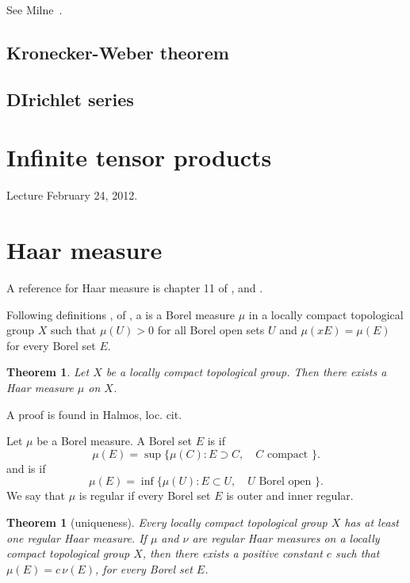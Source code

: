 \documentclass{amsart}
\newtheorem{theorem}[equation]{Theorem}
\begin{document}
See Milne~\cite[p. 154, 3.8,~Ex~3.9]{CFT}.

\subsection{Kronecker-Weber theorem}


\subsection{DIrichlet series}





\section{Infinite tensor products}

Lecture February 24, 2012.


\newpage
\section{Haar measure}

A reference for Haar measure is chapter 11 of \cite{Halmos-measure}, and
\cite[sec. 3]{bushnell-henniart}.   

Following definitions , 
of \cite{Halmos-measure},
a  is a Borel measure $\mu$ in a locally compact
topological group $X$ such that $\mu(U)>0$ for all Borel open sets $U$
and $\mu(x E) =\mu(E)$ for every Borel set $E$.

\begin{theorem} Let $X$ be a locally compact topological group.
Then there exists a Haar measure $\mu$ on $X$.
\end{theorem}

A proof is found in Halmos, loc. cit.

Let $\mu$ be a Borel measure.
A Borel set $E$ is 
 if
\[
\mu(E) = \sup \{\mu(C) : E\supset C,\quad C \text{ compact } \}.
\]
and is 
 if 
\[
\mu(E) = \inf \{\mu(U) : E\subset U,\quad U \text{ Borel open } \}.
\]
We say that $\mu$ is regular if every Borel set $E$ is outer and inner regular.

\begin{theorem}[uniqueness]  Every locally compact topological group $X$ has
 at least one regular Haar measure.  If $\mu$ and $\nu$ are regular
Haar measures on a locally compact topological group $X$, then there exists
a positive constant $c$ such that $\mu(E)=c\,\nu(E)$, for every Borel set $E$.
\end{theorem}
\end{document}
